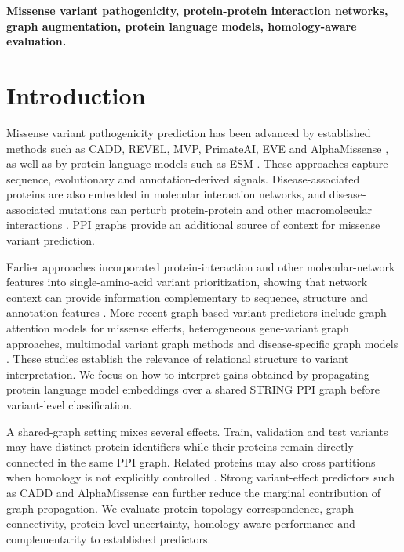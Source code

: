 \documentclass[conference]{IEEEtran}
\begin{document}
\begin{IEEEkeywords}
\bfseries\boldmath
Missense variant pathogenicity, protein-protein interaction networks, graph augmentation, protein language models, homology-aware evaluation.
\end{IEEEkeywords}

\section{Introduction}

Missense variant pathogenicity prediction has been advanced by established methods such as CADD, REVEL, MVP, PrimateAI, EVE and AlphaMissense \cite{Kircher2014CADD,Ioannidis2016REVEL,Qi2021MVP,Sundaram2018PrimateAI,Frazer2021EVE,Cheng2023AlphaMissense}, as well as by protein language models such as ESM \cite{Lin2023ESM}. These approaches capture sequence, evolutionary and annotation-derived signals. Disease-associated proteins are also embedded in molecular interaction networks, and disease-associated mutations can perturb protein-protein and other macromolecular interactions \cite{Barabasi2011NetworkMedicine,Menche2015DiseaseModules,Sahni2015InteractionPerturbation,Chen2018InteractomePerturbation}. PPI graphs provide an additional source of context for missense variant prediction.

Earlier approaches incorporated protein-interaction and other molecular-network features into single-amino-acid variant prioritization, showing that network context can provide information complementary to sequence, structure and annotation features \cite{Yates2014SuSPect,Ozturk2022NetworkFeatures}. More recent graph-based variant predictors include graph attention models for missense effects, heterogeneous gene-variant graph approaches, multimodal variant graph methods and disease-specific graph models \cite{Zhang2022gMVP,Cheng2021VEGN,Yu2025GNNMAP,Ghadie2025DiseaseSpecificGNN}. These studies establish the relevance of relational structure to variant interpretation. We focus on how to interpret gains obtained by propagating protein language model embeddings over a shared STRING PPI graph before variant-level classification.

A shared-graph setting mixes several effects. Train, validation and test variants may have distinct protein identifiers while their proteins remain directly connected in the same PPI graph. Related proteins may also cross partitions when homology is not explicitly controlled \cite{Littmann2022ProteinMLTips,Teufel2023GraphPart}. Strong variant-effect predictors such as CADD and AlphaMissense can further reduce the marginal contribution of graph propagation. We evaluate protein-topology correspondence, graph connectivity, protein-level uncertainty, homology-aware performance and complementarity to established predictors.
\end{document}
